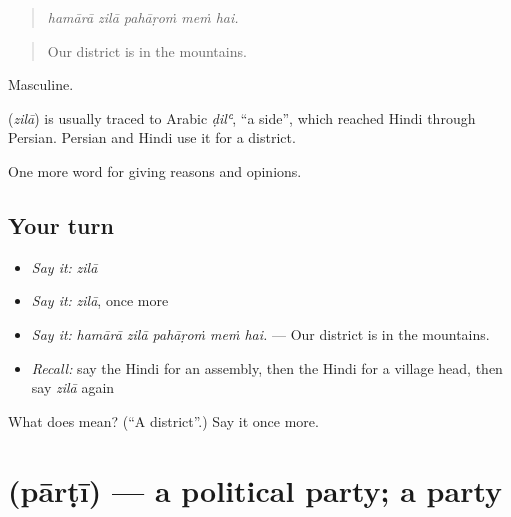 \begin{quote}
    
\end{quote}

\begin{quote}
\emph{hamārā zilā pahāṛoṁ meṁ hai.}
\end{quote}

\begin{quote}
Our district is in the mountains.
\end{quote}

Masculine.

\begin{cousinweb}
\textbf{} (\emph{zilā}) is usually traced to Arabic \emph{ḍilʿ}, \textquotedblleft{}a side\textquotedblright{}, which reached Hindi through Persian. Persian and Hindi use it for a district.
\end{cousinweb}

\begin{grammarlens}[title={What you've built}]
One more word for giving reasons and opinions.
\end{grammarlens}

\subsection*{Your turn}
\begin{itemize}
\raggedright
  \item \emph{Say it:} \emph{zilā}
  \item \emph{Say it:} \emph{zilā}, once more
  \item \emph{Say it:} \emph{hamārā zilā pahāṛoṁ meṁ hai.} — Our district is in the mountains.
  \item \emph{Recall:} say the Hindi for an assembly, then the Hindi for a village head, then say \emph{zilā} again
\end{itemize}

\begin{tcolorbox}[breakable,colback=teal!4,colframe=teal!35!black,title={Before you move on}]
What does  mean? (\textquotedblleft{}A district\textquotedblright{}.) Say it once more.
\end{tcolorbox}
\section[\texorpdfstring{\hi{पार्टी} (pārṭī)}{पार्टी (pārṭī)}]{ (pārṭī) — a political party; a party}

